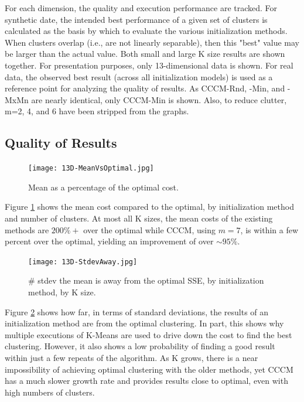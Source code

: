 \documentclass{article}
\begin{document}
For each dimension, the quality and execution performance are tracked.  For synthetic date, the intended best performance of a given set of clusters is calculated as the basis by which to evaluate the various initialization methods.  When clusters overlap (i.e., are not linearly separable), then this "best" value may be larger than the actual value.  Both small and large K size results are shown together.  For presentation purposes, only 13-dimensional data is shown.  For real data, the observed best result (across all initialization models) is used as a reference point for analyzing the quality of results.  As CCCM-Rnd, -Min, and -MxMn are nearly identical, only CCCM-Min is shown.  Also, to reduce clutter, m=2, 4, and 6 have been stripped from the graphs.

\subsection{Quality of Results}

\begin{figure}
  \centering
  \texttt{[image: 13D-MeanVsOptimal.jpg]}
  \caption{Mean as a percentage of the optimal cost.}
  \label{fig:meanVsOptimal13D}
\end{figure}

Figure \ref{fig:meanVsOptimal13D} shows the mean cost compared to the optimal, by initialization method and number of clusters.  At most all K sizes, the mean costs of the existing methods are $200\%+$ over the optimal while CCCM, using $m=7$, is within a few percent over the optimal, yielding an improvement of over $\sim$$95\%$.

\begin{figure}
  \centering
  \texttt{[image: 13D-StdevAway.jpg]}
  \caption{\# stdev the mean is away from the optimal SSE, by initialization method, by K size.}
  \label{fig:stdevAway13D}
\end{figure}

Figure \ref{fig:stdevAway13D} shows how far, in terms of standard deviations, the results of an initialization method are from the optimal clustering.  In part, this shows why multiple executions of K-Means are used to drive down the cost to find the best clustering.  However, it also shows a low probability of finding a good result within just a few repeats of the algorithm.  As K grows, there is a near impossibility of achieving optimal clustering with the older methods, yet CCCM has a much slower growth rate and provides results close to optimal, even with high numbers of clusters.
\end{document}
